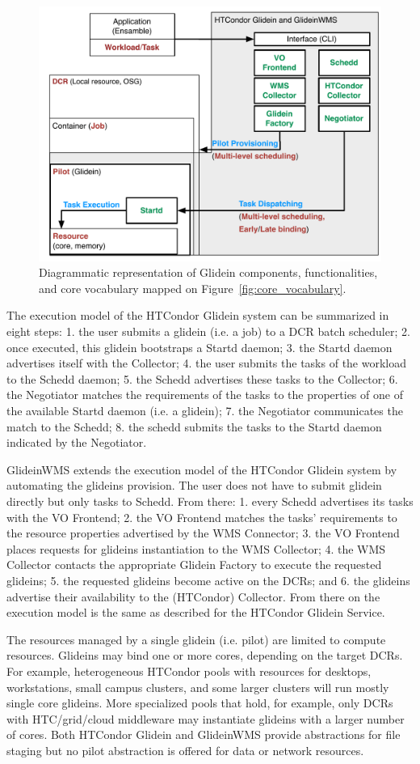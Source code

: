 \documentclass{sig-alternate}
\begin{document}
\begin{figure}[t]
    \centering
        \includegraphics[width=.48\textwidth]{figures/glidein_comparison.pdf}
        \caption{Diagrammatic representation of Glidein components,
          functionalities, and core vocabulary mapped on
          Figure~\ref{fig:core_vocabulary}.}
    \label{fig:glidein_comparison}
\end{figure}

The execution model of the HTCondor Glidein system can be summarized in eight
steps: 1. the user submits a glidein (i.e. a job) to a DCR batch scheduler; 2.
once executed, this glidein bootstraps a Startd daemon; 3. the Startd daemon
advertises itself with the Collector; 4. the user submits the tasks of the
workload to the Schedd daemon; 5. the Schedd advertises these tasks to the
Collector; 6. the Negotiator matches the requirements of the tasks to the
properties of one of the available Startd daemon (i.e. a glidein); 7. the
Negotiator communicates the match to the Schedd; 8. the schedd submits the tasks
to the Startd daemon indicated by the Negotiator.

GlideinWMS extends the execution model of the HTCondor Glidein system by
automating the glideins provision. The user does not have to submit glidein
directly but only tasks to Schedd. From there: 1. every Schedd advertises its
tasks with the VO Frontend; 2. the VO Frontend matches the tasks' requirements
to the resource properties advertised by the WMS Connector; 3. the VO Frontend
places requests for glideins instantiation to the WMS Collector; 4. the WMS
Collector contacts the appropriate Glidein Factory to execute the requested
glideins; 5. the requested glideins become active on the DCRs; and 6. the
glideins advertise their availability to the (HTCondor) Collector. From there on
the execution model is the same as described for the HTCondor Glidein Service.


The resources managed by a single glidein (i.e. pilot) are limited to compute
resources. Glideins may bind one or more cores, depending on the target DCRs.
For example, heterogeneous HTCondor pools with resources for desktops,
workstations, small campus clusters, and some larger clusters will run mostly
single core glideins. More specialized pools that hold, for example, only DCRs
with HTC/grid/cloud middleware may instantiate glideins with a larger number of
cores. Both HTCondor Glidein and GlideinWMS provide abstractions for file
staging but no pilot abstraction is offered for data or network resources.
\end{document}
